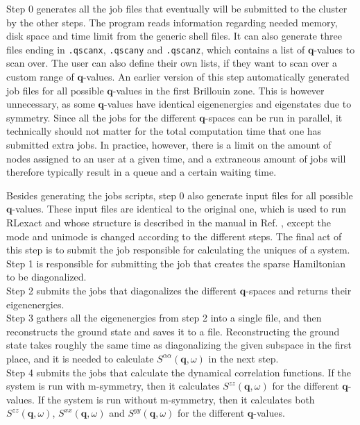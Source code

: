 \documentclass{article}
\begin{document}
	Step 0 generates all the job files that eventually will be submitted to the cluster by the other steps. The program reads information regarding needed memory, disk space and time limit from the generic shell files. It can also generate three files ending in \texttt{.qscanx}, \texttt{.qscany} and \texttt{.qscanz}, which contains a list of $\textbf{q}$-values to scan over. The user can also define their own lists, if they want to scan over a custom range of $\textbf{q}$-values. An earlier version of this step automatically generated job files for all possible $\textbf{q}$-values in the first Brillouin zone. This is however unnecessary, as some $\textbf{q}$-values have identical eigenenergies and eigenstates due to symmetry. Since all the jobs for the different $\textbf{q}$-spaces can be run in parallel, it technically should not matter for the total computation time that one has submitted extra jobs. In practice, however, there is a limit on the amount of nodes assigned to an user at a given time, and a extraneous amount of jobs will therefore typically result in a queue and a certain waiting time. 
	
	Besides generating the jobs scripts, step 0 also generate input files for all possible $\textbf{q}$-values. These input files are identical to the original one, which is used to run RLexact and whose structure is described in the manual in Ref. \cite{RLexactmanual}, except the mode and unimode is changed according to the different steps. The final act of this step is to submit the job responsible for calculating the uniques of a system. \\
	
	Step 1 is responsible for submitting the job that creates the sparse Hamiltonian to be diagonalized. \\
	
	Step 2 submits the jobs that diagonalizes the different $\textbf{q}$-spaces and returns their eigenenergies.  \\
	
	Step 3 gathers all the eigenenergies from step 2 into a single file, and then reconstructs the ground state and saves it to a file. Reconstructing the ground state takes roughly the same time as diagonalizing the given subspace in the first place, and it is needed to calculate $S^{\alpha \alpha} (\textbf{q}, \omega)$ in the next step.\\
	
	Step 4 submits the jobs that calculate the dynamical correlation functions. If the system is run with m-symmetry, then it calculates $S^{zz} (\textbf{q}, \omega)$ for the different $\textbf{q}$-values. If the system is run without m-symmetry, then it calculates both $S^{zz} (\textbf{q}, \omega)$, $S^{xx} (\textbf{q}, \omega)$ and $S^{yy} (\textbf{q}, \omega)$ for the different $\textbf{q}$-values.\\
	
\end{document}
